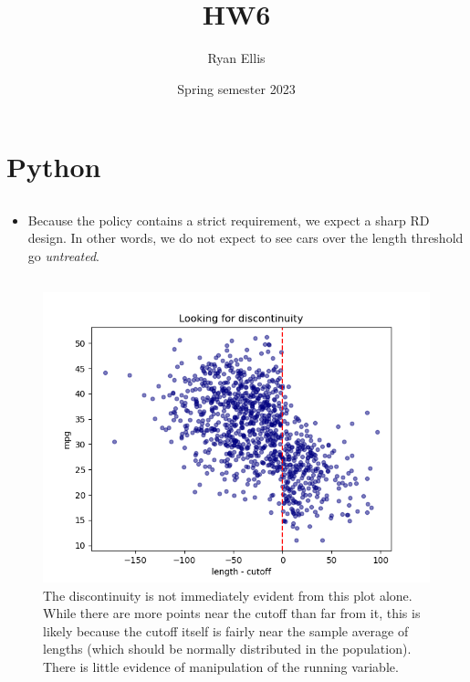 \documentclass{article}
\title{HW6}
\author{Ryan Ellis}
\date{Spring semester 2023}
\begin{document}
  
\maketitle

\section{Python}
\subsection{}
\begin{itemize}
    \item Because the policy contains a strict requirement, we expect a sharp RD design. In other words, we do not expect to see cars over the length threshold go \textit{untreated}.
\end{itemize}

\subsection{}
\begin{figure}[!h]
    \centering
    \includegraphics[scale=.9]{homework6/output/scatterplot.png}
    \caption{The discontinuity is not immediately evident from this plot alone. While there are more points near the cutoff than far from it, this is likely because the cutoff itself is fairly near the sample average of lengths (which should be normally distributed in the population). There is little evidence of manipulation of the running variable.}
    \label{fig:figure1}
\end{figure}
\end{document}
